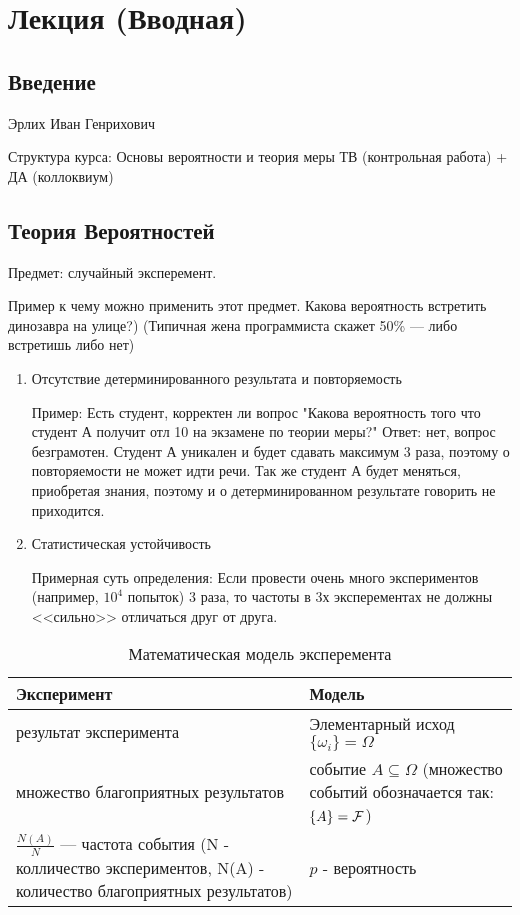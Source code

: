 \section{Лекция (Вводная)}
\subsection{Введение}
Эрлих  Иван Генрихович

Структура курса:
Основы вероятности и теория меры
ТВ (контрольная работа) + ДА (коллоквиум)

\subsection{Теория Вероятностей}

Предмет: случайный эксперемент.

Пример к чему можно применить этот предмет. Какова вероятность встретить динозавра на улице?) (Типичная жена программиста скажет 50\% --- либо встретишь либо нет)

\begin{enumerate}
	\item Отсутствие детерминированного результата и повторяемость
	
	Пример: Есть студент, корректен ли вопрос "Какова вероятность того что студент А получит отл 10 на экзамене по теории меры?" 
	Ответ: нет, вопрос безграмотен. Студент А уникален и будет сдавать максимум 3 раза, поэтому о повторяемости не может идти речи. Так же студент А будет меняться, приобретая знания, поэтому и о детерминированном результате говорить не приходится.
	
	\item Статистическая устойчивость
	
	Примерная суть определения:
	Если провести очень много экспериментов (например, $10^4$ попыток) 3 раза, то частоты в 3х эксперементах не должны <<сильно>> отличаться друг от друга. 
\end{enumerate}



\begin{table}[!ht]
	\caption{Математическая модель эксперемента}
	\begin{tabular}{p{}|p{}}
		Эксперимент & Модель \\
		\hline
		результат эксперимента & Элементарный исход$ \{\omega_i\} = \Omega $  \\
		множество благоприятных результатов & событие $A \subseteq \Omega$ (множество событий обозначается так: $\{A\} = \mathcal{F}$) \\
		$\frac{N(A)}{N}$ --- частота события (N - колличество экспериментов, N(A) - количество благоприятных результатов) & $p$ - вероятность \\
		\hline
	\end{tabular}
\end{table}

